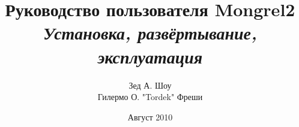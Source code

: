 


\title{
    Руководство пользователя Mongrel2\\
    \textit{Установка, развёртывание, эксплуатация}
}
\author{Зед А. Шоу\\ \small{Гилермо О. "Tordek" Фреши}}
\date{Август 2010}



\frontmatter

\maketitle

\tableofcontents



\mainmatter








\appendix



